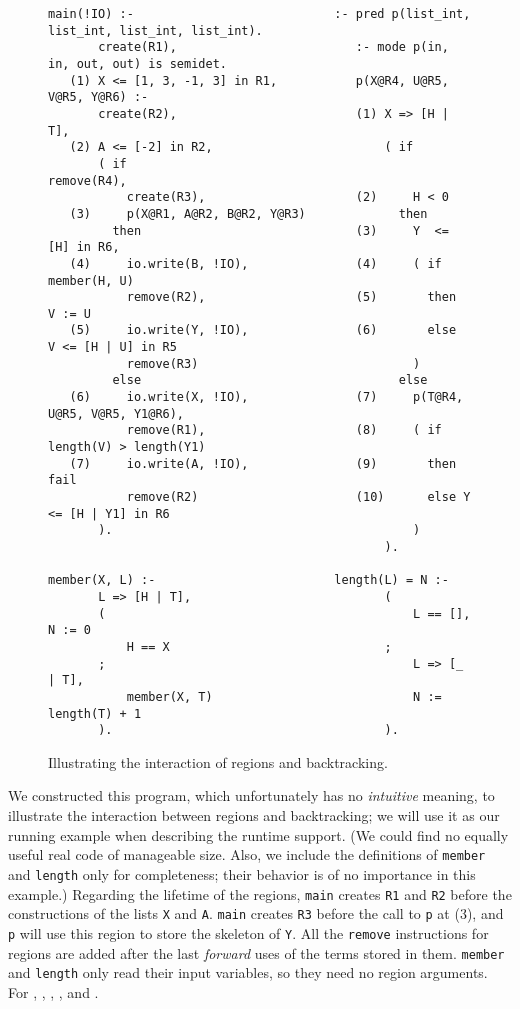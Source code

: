 \documentclass{tlp}
\newcommand{\code}[1]{{\tt#1}}
\begin{document}
\begin{figure}[htb]
\scriptsize
\vspace{2mm}
\begin{Verbatim}[frame=single,framerule=0.2pt,framesep=3pt]
   main(!IO) :-                            :- pred p(list_int, list_int, list_int, list_int).
       create(R1),                         :- mode p(in, in, out, out) is semidet.
   (1) X <= [1, 3, -1, 3] in R1,           p(X@R4, U@R5, V@R5, Y@R6) :-
       create(R2),                         (1) X => [H | T],
   (2) A <= [-2] in R2,                        ( if
       ( if                                        remove(R4),
           create(R3),                     (2)     H < 0
   (3)     p(X@R1, A@R2, B@R2, Y@R3)             then
         then                              (3)     Y  <= [H] in R6,
   (4)     io.write(B, !IO),               (4)     ( if    member(H, U)
           remove(R2),                     (5)       then  V := U
   (5)     io.write(Y, !IO),               (6)       else  V <= [H | U] in R5
           remove(R3)                              )
         else                                    else
   (6)     io.write(X, !IO),               (7)     p(T@R4, U@R5, V@R5, Y1@R6),
           remove(R1),                     (8)     ( if length(V) > length(Y1)
   (7)     io.write(A, !IO),               (9)       then fail
           remove(R2)                      (10)      else Y <= [H | Y1] in R6
       ).                                          )
                                               ).

member(X, L) :-                         length(L) = N :-
       L => [H | T],                           (
       (                                           L == [], N := 0
           H == X                              ;
       ;                                           L => [_ | T],
           member(X, T)                            N := length(T) + 1
       ).                                      ).
\end{Verbatim}
\small
\caption{Illustrating the interaction of regions and backtracking.}
\label{fig:running2:annotated}
\normalsize
\end{figure}

We constructed this program,
which unfortunately has no \emph{intuitive} meaning,
to illustrate the interaction between regions and backtracking;
we will use it as our running example when describing the runtime support.
(We could find no equally useful real code of manageable size.
Also, we include the definitions of \code{member} and \code{length}
only for completeness;
their behavior is of no importance in this example.)
Regarding the lifetime of the regions,
\code{main} creates \code{R1} and \code{R2}
before the constructions of the lists \code{X} and \code{A}.
\code{main} creates \code{R3} before the call to \code{p} at (3),
and \code{p} will use this region to store the skeleton of \code{Y}.
All the \code{remove} instructions for regions are added
after the last \emph{forward} uses of the terms stored in them.
\code{member} and \code{length} only read their input variables,
so they need no region arguments.
For , , ,
, and .
\end{document}
